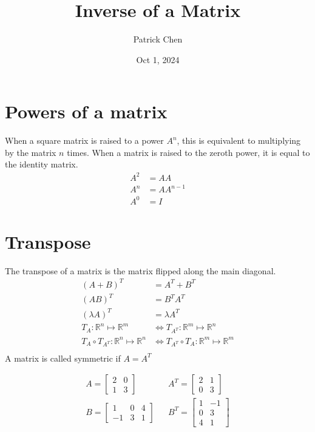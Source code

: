 \documentclass{article}
\title{Inverse of a Matrix}
\author{Patrick Chen}
\date{Oct 1, 2024}
\theoremstyle{mytheoremstyle}
\theoremstyle{mytheoremstyle}
\theoremstyle{myproblemstyle}
\begin{document}
    \maketitle
    \section*{Powers of a matrix}
    When a square matrix is raised to a power $A^n$, this is equivalent to
    multiplying by the matrix $n$ times. When a matrix is raised to the zeroth
    power, it is equal to the identity matrix.
    \begin{align*}
        A^2 &=AA \\
        A^n &= AA^{n-1} \\
        A^0 &= I
    \end{align*}

    \section*{Transpose}
    The transpose of a matrix is the matrix flipped along the main diagonal.
    \begin{align*}
        (A+B)^T         &= A^T+B^T \\
        (AB)^T          &= B^TA^T \\
        (\lambda A)^T   &= \lambda A^T \\
        T_{A}: \mathbb{R}^n \mapsto \mathbb{R}^m &\Leftrightarrow
        T_{A^T}: \mathbb{R}^m \mapsto \mathbb{R}^n \\
        T_{A} \circ T_{A^T}: \mathbb{R}^n \mapsto \mathbb{R}^n &\Leftrightarrow
        T_{A^T} \circ T_{A}: \mathbb{R}^m \mapsto \mathbb{R}^m \\
    \end{align*}
    A matrix is called symmetric if $A=A^T$

    \begin{align*}
        A = \begin{bmatrix}
            2 & 0 \\
            1 & 3
        \end{bmatrix} &&
        A^T = \begin{bmatrix}
            2 & 1 \\
            0 & 3
        \end{bmatrix} \\
        B = \begin{bmatrix}
            1 & 0 & 4 \\
            -1 & 3 & 1
        \end{bmatrix} &&
        B^T = \begin{bmatrix}
            1 & -1 \\
            0 & 3 \\
            4 & 1
        \end{bmatrix}
    \end{align*}
\end{document}

